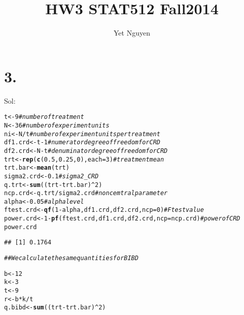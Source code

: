 \documentclass{article}\usepackage[]{graphicx}\usepackage[]{color}
\makeatletter
\newcommand{\hlnum}[1]{\textcolor[rgb]{0.686,0.059,0.569}{#1}}%
\newcommand{\hlcom}[1]{\textcolor[rgb]{0.678,0.584,0.686}{\textit{#1}}}%
\newcommand{\hlopt}[1]{\textcolor[rgb]{0,0,0}{#1}}%
\newcommand{\hlstd}[1]{\textcolor[rgb]{0.345,0.345,0.345}{#1}}%
\newcommand{\hlkwb}[1]{\textcolor[rgb]{0.69,0.353,0.396}{#1}}%
\newcommand{\hlkwc}[1]{\textcolor[rgb]{0.333,0.667,0.333}{#1}}%
\newcommand{\hlkwd}[1]{\textcolor[rgb]{0.737,0.353,0.396}{\textbf{#1}}}%
\newenvironment{kframe}{%
 \def\at@end@of@kframe{}%
 \ifinner\ifhmode%
  \def\at@end@of@kframe{\end{minipage}}%
  \begin{minipage}{\columnwidth}%
 \fi\fi%
 \def\FrameCommand##1{\hskip\@totalleftmargin \hskip-\fboxsep
 \colorbox{shadecolor}{##1}\hskip-\fboxsep
     \hskip-\linewidth \hskip-\@totalleftmargin \hskip\columnwidth}%
 \MakeFramed {\advance\hsize-\width
   \@totalleftmargin\z@ \linewidth\hsize
   \@setminipage}}%
 {\par\unskip\endMakeFramed%
 \at@end@of@kframe}
\newenvironment{knitrout}{}{} %
\makeatother
\begin{document}
\title{HW3 STAT512 Fall2014}

\author{Yet Nguyen}

\maketitle



\section*{3.}
Sol: 

\begin{knitrout}
\color{fgcolor}\begin{kframe}
\begin{alltt}
\hlstd{t} \hlkwb{<-} \hlnum{9} \hlcom{# number of treatment}
\hlstd{N} \hlkwb{<-} \hlnum{36} \hlcom{# number of experiment units}
\hlstd{ni} \hlkwb{<-} \hlstd{N}\hlopt{/}\hlstd{t} \hlcom{# number of experiment units per treatment}
\hlstd{df1.crd} \hlkwb{<-} \hlstd{t} \hlopt{-} \hlnum{1} \hlcom{# numerator degree of freedom for CRD}
\hlstd{df2.crd} \hlkwb{<-} \hlstd{N} \hlopt{-} \hlstd{t} \hlcom{# denuminator degree of freedom for CRD}
\hlstd{trt} \hlkwb{<-} \hlkwd{rep}\hlstd{(}\hlkwd{c}\hlstd{(}\hlnum{0.5}\hlstd{,} \hlnum{0.25}\hlstd{,} \hlnum{0}\hlstd{),} \hlkwc{each} \hlstd{=} \hlnum{3}\hlstd{)} \hlcom{# treatment mean}
\hlstd{trt.bar} \hlkwb{<-} \hlkwd{mean}\hlstd{(trt)}
\hlstd{sigma2.crd} \hlkwb{<-} \hlnum{0.1} \hlcom{# sigma2_CRD}
\hlstd{q.trt} \hlkwb{<-} \hlkwd{sum}\hlstd{((trt} \hlopt{-} \hlstd{trt.bar)}\hlopt{^}\hlnum{2}\hlstd{)}
\hlstd{ncp.crd} \hlkwb{<-}\hlstd{q.trt}\hlopt{/}\hlstd{sigma2.crd} \hlcom{# non cemtral parameter}
\hlstd{alpha} \hlkwb{<-} \hlnum{0.05} \hlcom{# alpha level}
\hlstd{ftest.crd} \hlkwb{<-} \hlkwd{qf}\hlstd{(}\hlnum{1}\hlopt{-}\hlstd{alpha, df1.crd,df2.crd,} \hlkwc{ncp} \hlstd{=} \hlnum{0}\hlstd{)} \hlcom{# F test value}
\hlstd{power.crd} \hlkwb{<-} \hlnum{1} \hlopt{-} \hlkwd{pf}\hlstd{(ftest.crd, df1.crd, df2.crd,} \hlkwc{ncp} \hlstd{= ncp.crd)} \hlcom{# power of CRD}
\hlstd{power.crd}
\end{alltt}
\begin{verbatim}
## [1] 0.1764
\end{verbatim}
\begin{alltt}
\hlcom{## We calculate the same quantities for BIBD}

\hlstd{b} \hlkwb{<-} \hlnum{12}
\hlstd{k} \hlkwb{<-} \hlnum{3}
\hlstd{t} \hlkwb{<-} \hlnum{9}
\hlstd{r} \hlkwb{<-} \hlstd{b}\hlopt{*}\hlstd{k}\hlopt{/}\hlstd{t}
\hlstd{q.bibd} \hlkwb{<-} \hlkwd{sum}\hlstd{((trt} \hlopt{-} \hlstd{trt.bar)}\hlopt{^}\hlnum{2}\hlstd{)}


\end{alltt}
\end{kframe}
\end{knitrout}
\end{document}
